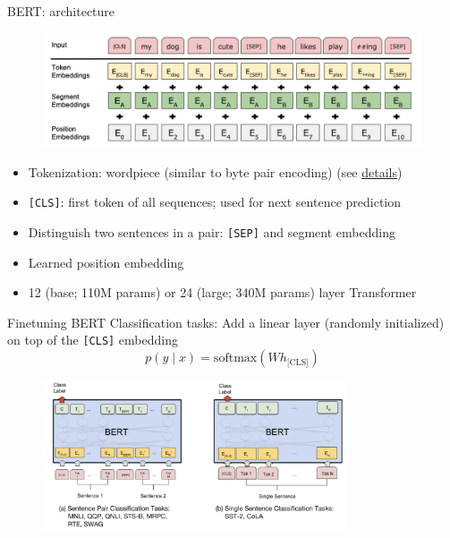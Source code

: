 \documentclass[usenames,dvipsnames,notes,11pt,aspectratio=169,hyperref={colorlinks=true, linkcolor=blue}]{beamer}
\begin{document}
\begin{frame}
    {BERT: architecture}
    \begin{figure}
            \includegraphics[width=.9\textwidth]{figures/bert}
    \end{figure}
    \vspace{-1em}
    \begin{itemize}[<+->]
        \item Tokenization: wordpiece (similar to byte pair encoding) (see \href{https://huggingface.co/learn/nlp-course/chapter6/6?fw=pt}{details})
        \item \texttt{[CLS]}: first token of all sequences; used for next sentence prediction
        \item Distinguish two sentences in a pair: \texttt{[SEP]} and segment embedding
        \item Learned position embedding
        \item 12 (base; 110M params) or 24 (large; 340M params) layer Transformer
    \end{itemize}
\end{frame}

\begin{frame}
    {Finetuning BERT}
        Classification tasks:
            Add a linear layer (randomly initialized) on top of the \texttt{[CLS]} embedding
            $$
            p(y\mid x) = \mathrm{softmax}(Wh_{\text{[CLS]}})
            $$
            \begin{figure}
                \includegraphics[width=0.8\textwidth]{figures/bert-classification}
            \end{figure}
\end{frame}
\end{document}
